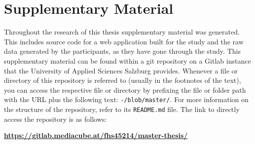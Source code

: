 \section*{Supplementary Material}

Throughout the research of this thesis supplementary material was generated. This includes source code for a web application built for the study and the raw data generated by the participants, as they have gone through the study. This supplementary material can be found within a git repository on a Gitlab instance that the University of Applied Sciences Salzburg provides. Whenever a file or directory of this repository is referred to (usually in the footnotes of the text), you can access the respective file or directory by prefixing the file or folder path with the URL plus the following text: \texttt{-/blob/master/}. For more information on the structure of the repository, refer to its \texttt{README.md} file. The link to directly access the repository is as follows:

\begin{center}
  \textbf{\url{https://gitlab.mediacube.at/fhs45214/master-thesis/}}
\end{center}